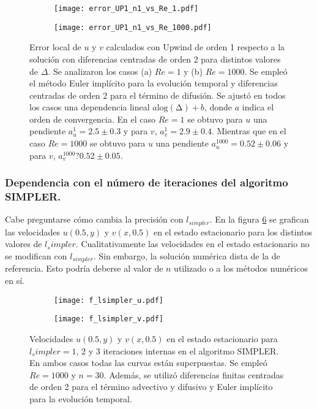 \documentclass[aps,prb,twocolumn,superscriptaddress,floatfix,longbibliography,10pt]{revtex4-2}
\newcounter{para}
\begin{document}
\begin{figure}
  \centering
  \begin{subfigure}[b]{0.3\textwidth}
      \centering
      \texttt{[image: error\_UP1\_n1\_vs\_Re\_1.pdf]}
      \caption{}
      \label{fig:error_UP1_n1_vs_Re_1}
  \end{subfigure}
  \hfill
  \begin{subfigure}[b]{0.3\textwidth}
      \centering
      \texttt{[image: error\_UP1\_n1\_vs\_Re\_1000.pdf]}
      \caption{}
      \label{fig:error_UP1_n1_vs_Re_1000}
  \end{subfigure}
     \caption{Error local de $u$ y $v$ calculados con Upwind de orden 1 respecto a la solución con diferencias centradas de orden 2 para distintos valores de $\Delta$. Se analizaron los casos (a) $Re = 1$ y (b) $Re = 1000$. Se empleó el método Euler implícito para la evolución temporal y diferencias centradas de orden 2 para el término de difusión. Se ajustó en todos los casos una dependencia lineal $a \mathrm{log(\Delta)} + b$, donde $a$ indica el orden de convergencia. En el caso $Re = 1$ se obtuvo para $u$ una pendiente $a_{u}^1 = 2.5 \pm 0.3$ y para $v$, $a_{v}^1 = 2.9 \pm 0.4$. Mientras que en el caso $Re = 1000$ se obtuvo para $u$ una pendiente $a_u^1000 = 0.52 \pm 0.06$ y para $v$, $a_v^1000 ? 0.52 \pm 0.05$.
     }
     \label{fig:error_UP1_n1_vs_Re}
\end{figure}

\subsubsection{Dependencia con el número de iteraciones del algoritmo SIMPLER.}

Cabe preguntarse cómo cambia la precisión con $l_{simpler}$. En la figura \ref{fig:lsimpler} se grafican las velocidades $u(0.5,y)$ y $v(x,0.5)$ en el estado estacionario para los distintos valores de $l_simpler$. Cualitativamente las velocidades en el estado estacionario no se modifican con $l_{simpler}$. Sin embargo, la solución numérica dista de la de referencia. Esto podría deberse al valor de $n$ utilizado o a los métodos numéricos en sí.

\begin{figure}
  \centering
  \begin{subfigure}[b]{0.3\textwidth}
      \centering
      \texttt{[image: f\_lsimpler\_u.pdf]}
      \caption{}
      \label{fig:lsimpler_u}
  \end{subfigure}
  \hfill
  \begin{subfigure}[b]{0.3\textwidth}
      \centering
      \texttt{[image: f\_lsimpler\_v.pdf]}
      \caption{}
      \label{fig:lsimpler_v}
  \end{subfigure}
     \caption{Velocidades $u(0.5,y)$ y $v(x,0.5)$ en el estado estacionario para $l_simpler = 1$, $2$ y $3$ iteraciones internas en el algoritmo SIMPLER. En ambos casos todas las curvas están superpuestas. Se empleó $Re = 1000$ y $n = 30$. Además, se utilizó diferencias finitas centradas de orden 2 para el término advectivo y difusivo y Euler implícito para la evolución temporal.}
     \label{fig:lsimpler}
\end{figure}
\end{document}
